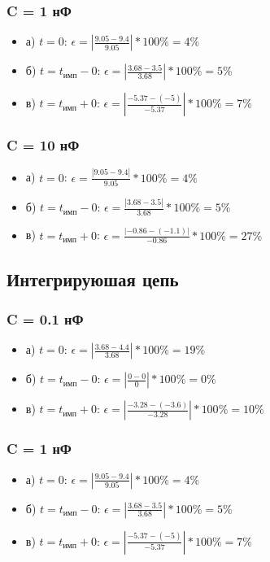 \subsubsection{C = 1 нФ}
\begin{itemize}
\item[] а) $t = 0$: $\epsilon = |\frac{9.05 - 9.4}{ 9.05 }| * 100\% = 4 \%$

\item[] б) $t = t_\text{имп} - 0$: $\epsilon = |\frac{3.68 - 3.5}{ 3.68 }| * 100\% = 5 \%$

\item[] в) $t = t_\text{имп} + 0$: $\epsilon = |\frac{-5.37 - (-5)}{ -5.37 }| * 100\% = 7 \%$
\end{itemize}

\subsubsection{C = 10 нФ}
\begin{itemize}
\item[] а) $t = 0$: $\epsilon = \frac{| 9.05 - 9.4 |}{ 9.05 } * 100\% = 4 \%$

\item[] б) $t = t_\text{имп} - 0$: $\epsilon = \frac{| 3.68 - 3.5 |}{ 3.68 } * 100\% = 5 \%$

\item[] в) $t = t_\text{имп} + 0$: $\epsilon = \frac{| -0.86 - (-1.1) |}{ -0.86 } * 100\% = 27 \%$
\end{itemize}

\subsection{Интегрируюшая цепь}
\subsubsection{C = 0.1 нФ}
\begin{itemize}
\item[] а) $t = 0$: $\epsilon = |\frac{3.68 - 4.4}{ 3.68 }| * 100\% = 19 \%$

\item[] б) $t = t_\text{имп} - 0$: $\epsilon = |\frac{0 - 0}{ 0 }| * 100\% = 0 \%$

\item[] в) $t = t_\text{имп} + 0$: $\epsilon = |\frac{-3.28 - (-3.6)}{ -3.28 }| * 100\% = 10 \%$ 
\end{itemize}

\subsubsection{C = 1 нФ}
\begin{itemize}
\item[] а) $t = 0$: $\epsilon = |\frac{9.05 - 9.4}{ 9.05 }| * 100\% = 4 \%$

\item[] б) $t = t_\text{имп} - 0$: $\epsilon = |\frac{3.68 - 3.5}{ 3.68 }| * 100\% = 5 \%$

\item[] в) $t = t_\text{имп} + 0$: $\epsilon = |\frac{-5.37 - (-5)}{ -5.37 }| * 100\% = 7 \%$
\end{itemize}

